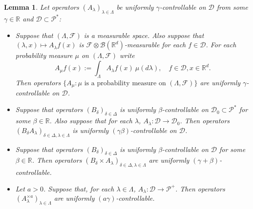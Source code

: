 \documentclass[12pt,oneside,english]{amsart}
\theoremstyle{plain}
\newtheorem{lem}[thm]{Lemma}
\theoremstyle{definition}
\numberwithin{equation}{section}
\begin{document}
\begin{lem}
\label{lem: property of controllable operators}
    Let operators $(A_\lambda)_{\lambda\in \Lambda}$ be uniformly $\gamma$-controllable on $\mathcal D$ from some $\gamma \in \mathbb R$ and $\mathcal D\subset \mathcal P^*$:
\begin{itemize}
\item[(1)]
    Suppose that $(\Lambda, \mathscr F)$ is a measurable space.
    Also suppose that $(\lambda,x)\mapsto A_\lambda f(x)$ is $\mathscr F \otimes \mathscr B(\mathbb R^d)$-measurable for each $f\in \mathcal D$.
    For each probability measure $\mu$ on $(\Lambda, \mathscr F)$ write
\[
    A_\mu f(x):= \int_{\Lambda} A_\lambda f (x)~\mu(d\lambda), \quad f\in \mathcal D, x\in \mathbb R^d.
\]
    Then operators $\{A_\mu: \mu \text{ is  a probability measure on } (\Lambda, \mathscr F)\}$ are uniformly $\gamma$-controllable on $\mathcal D$.
\item[(2)]
    Suppose that operators $(B_\delta)_{\delta\in \Delta}$ is uniformly $\beta$-controllable on $\mathcal D_0 \subset \mathcal P^*$ for some $\beta \in \mathbb R$.
    Also suppose that for each $\lambda$, $A_\lambda:\mathcal D \to \mathcal D_0$.
    Then operators $(B_\delta A_\lambda)_{\delta\in \Delta, \lambda \in \Lambda}$ is uniformly $(\gamma\beta)$-controllable on $\mathcal D$.
\item[(3)]
    Suppose that operators $(B_\delta)_{\delta \in \Delta}$ is uniformly $\beta$-controllable on $\mathcal D$ for some $\beta\in \mathbb R$.
    Then operators $(B_\delta\times A_\lambda)_{\delta \in \Delta, \lambda \in \Lambda}$ are uniformly $(\gamma+\beta)$-controllable.
\item[(4)]
    Let $a>0$. Suppose that, for each $\lambda \in \Lambda$, $A_\lambda : \mathcal D \to \mathcal P^+$.
    Then operators $(A^{\times a}_\lambda)_{\lambda \in \Lambda}$ are uniformly $(a\gamma)$-controllable.
\end{itemize}
\end{lem}
\end{document}
